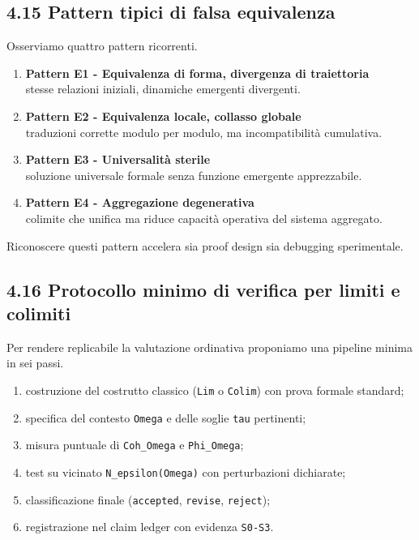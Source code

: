 \subsection{4.15 Pattern tipici di falsa equivalenza}

Osserviamo quattro pattern ricorrenti.

\begin{enumerate}
\def\labelenumi{\arabic{enumi}.}
\item
  \textbf{Pattern E1 - Equivalenza di forma, divergenza di traiettoria}\\
  stesse relazioni iniziali, dinamiche emergenti divergenti.
\item
  \textbf{Pattern E2 - Equivalenza locale, collasso globale}\\
  traduzioni corrette modulo per modulo, ma incompatibilità cumulativa.
\item
  \textbf{Pattern E3 - Universalità sterile}\\
  soluzione universale formale senza funzione emergente apprezzabile.
\item
  \textbf{Pattern E4 - Aggregazione degenerativa}\\
  colimite che unifica ma riduce capacità operativa del sistema aggregato.
\end{enumerate}

Riconoscere questi pattern accelera sia proof design sia debugging sperimentale.

\subsection{4.16 Protocollo minimo di verifica per limiti e colimiti}

Per rendere replicabile la valutazione ordinativa proponiamo una pipeline minima in sei passi.

\begin{enumerate}
\def\labelenumi{\arabic{enumi}.}
\tightlist
\item
  costruzione del costrutto classico (\texttt{Lim} o \texttt{Colim}) con prova formale standard;
\item
  specifica del contesto \texttt{Omega} e delle soglie \texttt{tau} pertinenti;
\item
  misura puntuale di \texttt{Coh\_Omega} e \texttt{Phi\_Omega};
\item
  test su vicinato \texttt{N\_epsilon(Omega)} con perturbazioni dichiarate;
\item
  classificazione finale (\texttt{accepted}, \texttt{revise}, \texttt{reject});
\item
  registrazione nel claim ledger con evidenza \texttt{S0-S3}.
\end{enumerate}

